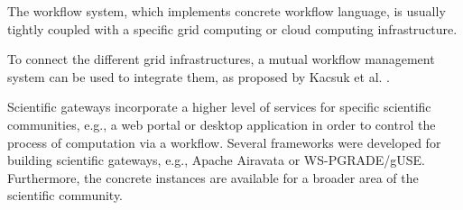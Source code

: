 The workflow system, which implements concrete workflow language, is usually tightly coupled with a specific grid computing or cloud computing infrastructure. 

To connect the different grid infrastructures, a mutual workflow management system can be used to integrate them, as proposed by Kacsuk et al. \cite{Kacsuk2008a,Kacsuk2011}.%

Scientific gateways incorporate a higher level of services for specific scientific communities, e.g., a web portal or desktop application in order to control the process of computation via a workflow\cite{Wilkins-Diehr2007}. Several frameworks were developed for building scientific gateways, e.g., Apache Airavata \cite{Pierce2014,Memon2014} or WS-PGRADE/gUSE\cite{Kacsuk2012}. Furthermore, the concrete instances are available for a broader area of the scientific community. 



